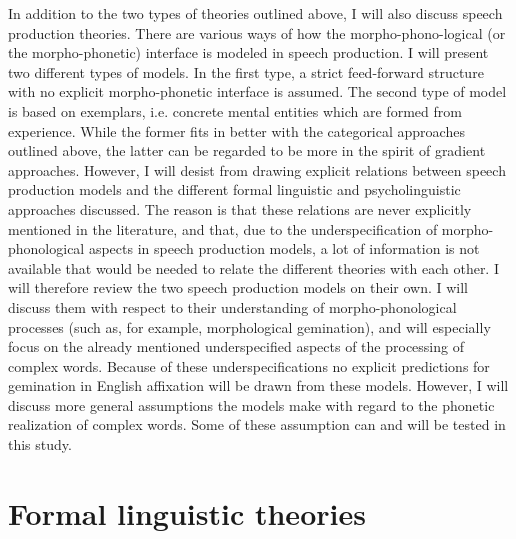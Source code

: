 In addition to the two types of theories outlined above, I will also discuss speech production theories. There are various ways of how the morpho-phono-logical (or the morpho-phonetic) interface is modeled in speech production.  
I will present two different types of models. In the first type, a strict feed-forward structure with no explicit morpho-phonetic interface is assumed. The second type of model is based on exemplars, i.e. concrete mental entities which are formed from experience. While the former fits in better with the categorical approaches outlined above, the latter can be regarded to be more in the spirit of gradient approaches. 
However, I will desist from drawing explicit relations between speech production models and the different formal linguistic and psycholinguistic approaches discussed. The reason is that these relations are never explicitly mentioned in the literature, and that, due to the underspecification of morpho-phonological aspects in speech production models, a lot of information is not available that would be needed to relate the different theories with each other.
I will therefore review the two speech production models on their own. I will discuss them with respect to their understanding of morpho-phonological processes (such as, for example, morphological gemination), and will especially focus on the already mentioned underspecified aspects of the processing of complex words.  Because of these underspecifications no explicit predictions for gemination in English affixation will be drawn from these models. However, I will discuss more general assumptions the models make with regard to the phonetic realization of complex words. Some of these assumption can and will be tested in this study.



\section{Formal linguistic theories} 

